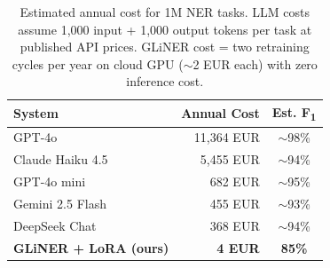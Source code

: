 \documentclass[11pt]{article}
\newcommand{\fone}{F\textsubscript{1}}
\begin{document}
\begin{table}[H]
    \centering
    \small
    \begin{tabular}{l r c}
        \toprule
        \rowcolor{headerblue!15}
        \textbf{System} & \textbf{Annual Cost} & \textbf{Est. \fone{}} \\
        \midrule
        GPT-4o & 11{,}364 EUR & ${\sim}$98\% \\
        Claude Haiku 4.5 & 5{,}455 EUR & ${\sim}$94\% \\
        GPT-4o mini & 682 EUR & ${\sim}$95\% \\
        Gemini 2.5 Flash & 455 EUR & ${\sim}$93\% \\
        DeepSeek Chat & 368 EUR & ${\sim}$94\% \\
        \midrule
        \rowcolor{lightgreen!50}
        \textbf{GLiNER + LoRA (ours)} & \textbf{4 EUR} & \textbf{85\%} \\
        \bottomrule
    \end{tabular}
    \caption{Estimated annual cost for 1M NER tasks. LLM costs assume 1{,}000 input + 1{,}000 output tokens per task at published API prices. GLiNER cost = two retraining cycles per year on cloud GPU (${\sim}$2 EUR each) with zero inference cost.}
    \label{tab:cost}
\end{table}
\end{document}
